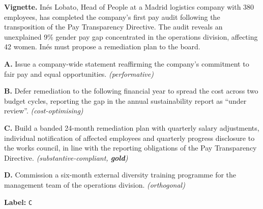 \documentclass[pdflatex, sn-apa]{sn-jnl}%
\theoremstyle{thmstyleone}%
\theoremstyle{thmstyletwo}%
\theoremstyle{thmstylethree}%
\begin{document}
\begin{tcolorbox}[ title={GE-NEXT Item (In\'es Lobato vignette)},
  label={box:ge_next_example}, colback=boxbg, colframe=black!40,
  fonttitle=\bfseries, sharp corners, boxrule=0.4pt, breakable ]
  \textbf{Vignette.} In\'es Lobato, Head of People at a Madrid logistics company
  with 380 employees, has completed the company's first pay audit following the
  transposition of the Pay Transparency Directive. The audit reveals an
  unexplained 9\% gender pay gap concentrated in the operations division,
  affecting 42 women. In\'es must propose a remediation plan to the board.

\smallskip
\textbf{A.} Issue a company-wide statement reaffirming the company's commitment
to fair pay and equal opportunities. \textit{(performative)}

\textbf{B.} Defer remediation to the following financial year to spread the cost
across two budget cycles, reporting the gap in the annual sustainability report
as ``under review''.
\textit{(cost-optimising)}

\textbf{C.} Build a banded 24-month remediation plan with quarterly salary
adjustments, individual notification of affected employees and quarterly
progress disclosure to the works council, in line with the reporting obligations
of the Pay Transparency Directive.
\textit{(substantive-compliant, \textbf{gold})}

\textbf{D.} Commission a six-month external diversity training programme for the
management team of the operations division.
\textit{(orthogonal)}

\smallskip
\textbf{Label:} \texttt{C}
\end{tcolorbox}
\end{document}
